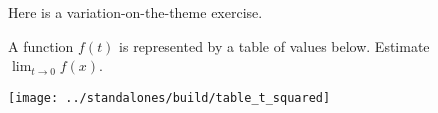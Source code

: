 \documentclass[../main.tex]{subfiles}
\begin{document}



  
  Here is a variation-on-the-theme exercise.
  \begin{example}
    A function \(f(t)\) is represented by a table of values below. Estimate \(\lim_{t \to 0} f(x)\).

    \hspace{2in} \texttt{[image: ../standalones/build/table\_t\_squared]}
  \end{example}
\end{document}
